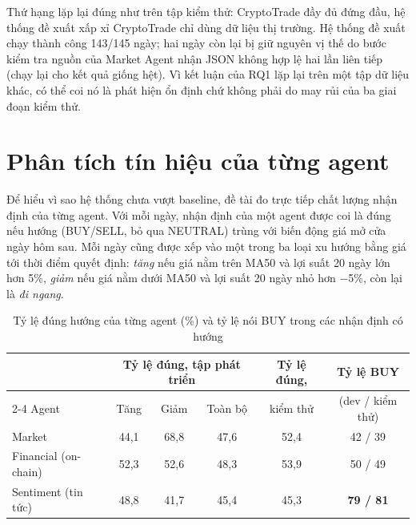 Thứ hạng lặp lại đúng như trên tập kiểm thử: CryptoTrade đầy đủ đứng đầu, hệ thống đề xuất xấp xỉ CryptoTrade chỉ dùng
dữ liệu thị trường. Hệ thống đề xuất chạy thành công 143/145 ngày; hai ngày còn lại bị giữ nguyên vị thế do bước kiểm tra
nguồn của Market Agent nhận JSON không hợp lệ hai lần liên tiếp (chạy lại cho kết quả giống hệt). Vì kết luận của
RQ1 lặp lại trên một tập dữ liệu khác, có thể coi nó là phát hiện ổn định chứ không phải do may rủi của ba giai đoạn
kiểm thử.

\section{Phân tích tín hiệu của từng agent}
\label{sec:signal-analysis}
Để hiểu vì sao hệ thống chưa vượt baseline, đề tài đo trực tiếp chất lượng nhận định của từng agent. Với mỗi ngày, nhận
định của một agent được coi là đúng nếu hướng (BUY/SELL, bỏ qua NEUTRAL) trùng với biến động giá mở cửa ngày hôm sau. Mỗi
ngày cũng được xếp vào một trong ba loại xu hướng bằng giá tới thời điểm quyết định: \emph{tăng} nếu giá nằm trên MA50 và
lợi suất 20 ngày lớn hơn 5\%, \emph{giảm} nếu giá nằm dưới MA50 và lợi suất 20 ngày nhỏ hơn $-$5\%, còn lại là \emph{đi
ngang}.

\begin{table}[H]
\centering
\caption{Tỷ lệ đúng hướng của từng agent (\%) và tỷ lệ nói BUY trong các nhận định có hướng}
\label{tab:agent-acc}
\small
\begin{tabular}{lccccc}
\toprule
 & \multicolumn{3}{c}{Tỷ lệ đúng, tập phát triển} & Tỷ lệ đúng, & Tỷ lệ BUY \\
\cmidrule(lr){2-4}
Agent & Tăng & Giảm & Toàn bộ & kiểm thử & (dev / kiểm thử) \\
\midrule
Market & 44,1 & 68,8 & 47,6 & 52,4 & 42 / 39 \\
Financial (on-chain) & 52,3 & 52,6 & 48,3 & 53,9 & 50 / 49 \\
Sentiment (tin tức) & 48,8 & 41,7 & 45,4 & 45,3 & \textbf{79 / 81} \\
\bottomrule
\end{tabular}
\end{table}

